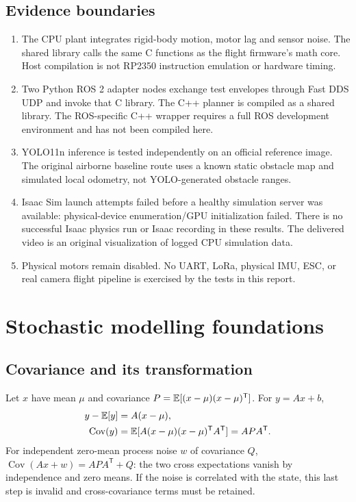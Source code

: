 \section{Evidence boundaries}
\begin{enumerate}
\item The CPU plant integrates rigid-body motion, motor lag and sensor noise.
The shared library calls the same C functions as the flight firmware's math
core. Host compilation is not RP2350 instruction emulation or hardware timing.
\item Two Python ROS 2 adapter nodes exchange test envelopes through Fast DDS
UDP and invoke that C library. The C++ planner is compiled as a shared library.
The ROS-specific C++ wrapper requires a full ROS development environment and
has not been compiled here.
\item YOLO11n inference is tested independently on an official reference image.
The original airborne baseline route uses a known static obstacle map and simulated local
odometry, not YOLO-generated obstacle ranges.
\item Isaac Sim launch attempts failed before a healthy simulation server was
available: physical-device enumeration/GPU initialization failed. There is no
successful Isaac physics run or Isaac recording in these results. The delivered
video is an original visualization of logged CPU simulation data.
\item Physical motors remain disabled. No UART, LoRa, physical IMU, ESC, or real
camera flight pipeline is exercised by the tests in this report.
\end{enumerate}

\chapter{Stochastic modelling foundations}
\section{Covariance and its transformation}
Let $x$ have mean $\mu$ and covariance
$P=\mathbb{E}[(x-\mu)(x-\mu)^{\mathsf T}]$. For $y=Ax+b$,
\begin{align}
y-\mathbb{E}[y]&=A(x-\mu),\\
\operatorname{Cov}(y)
 &=\mathbb{E}[A(x-\mu)(x-\mu)^{\mathsf T}A^{\mathsf T}]
 =APA^{\mathsf T}.
\end{align}
For independent zero-mean process noise $w$ of covariance $Q$,
$\operatorname{Cov}(Ax+w)=APA^{\mathsf T}+Q$: the two cross expectations
vanish by independence and zero means. If the noise is correlated with the
state, this last step is invalid and cross-covariance terms must be retained.

